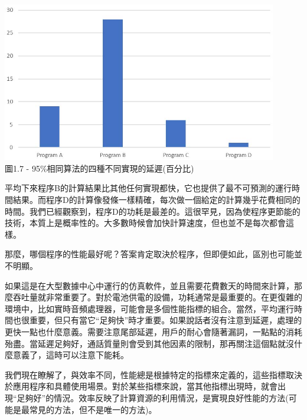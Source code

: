 \begin{center}
\includegraphics[width=0.9\textwidth]{content/1/chapter1/images/7.jpg}\\
圖1.7 - 95\%相同算法的四種不同實現的延遲(百分比)
\end{center}

平均下來程序B的計算結果比其他任何實現都快，它也提供了最不可預測的運行時間結果。而程序D的計算像發條一樣精確，每次做一個給定的計算幾乎花費相同的時間。我們已經觀察到，程序D的功耗是最差的。這很罕見，因為使程序更節能的技術，本質上是概率性的。大多數時候會加快計算速度，但也並不是每次都會這樣。

那麼，哪個程序的性能最好呢？答案肯定取決於程序，但即便如此，區別也可能並不明顯。


如果這是在大型數據中心中運行的仿真軟件，並且需要花費數天的時間來計算，那麼吞吐量就非常重要了。對於電池供電的設備，功耗通常是最重要的。在更復雜的環境中，比如實時音頻處理器，可能會是多個性能指標的組合。當然，平均運行時間也很重要，但只有當它“足夠快”時才重要。如果說話者沒有注意到延遲，處理的更快一點也什麼意義。需要注意尾部延遲，用戶的耐心會隨著漏詞，一點點的消耗殆盡。當延遲足夠好，通話質量則會受到其他因素的限制，那再關注這個點就沒什麼意義了，這時可以注意下能耗。

我們現在瞭解了，與效率不同，性能總是根據特定的指標來定義的，這些指標取決於應用程序和具體使用場景。對於某些指標來說，當其他指標出現時，就會出現“足夠好”的情況。效率反映了計算資源的利用情況，是實現良好性能的方法(可能是最常見的方法，但不是唯一的方法)。











